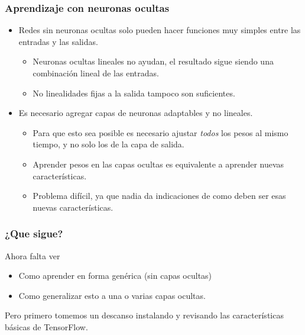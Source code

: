 \documentclass{beamer}
\begin{document}
\begin{frame}
  \frametitle{Aprendizaje con neuronas ocultas}

  \begin{itemize}
  \item Redes sin neuronas ocultas solo pueden hacer funciones muy
    simples entre las entradas y las salidas.
    \begin{itemize}
    \item Neuronas ocultas lineales no ayudan, el resultado sigue
      siendo una combinación lineal de las entradas.
    \item No linealidades fijas a la salida tampoco son suficientes.
    \end{itemize}
  \item Es necesario agregar capas de neuronas adaptables y no
    lineales.
    \begin{itemize}
    \item Para que esto sea posible es necesario ajustar \emph{todos}
      los pesos al mismo tiempo, y no solo los de la capa de salida.
    \item Aprender pesos en las capas ocultas es equivalente a
      aprender nuevas características.
    \item Problema difícil, ya que nadia da indicaciones de como deben
      ser esas nuevas características.
    \end{itemize}
  \end{itemize}
  
\end{frame}

\begin{frame}
  \frametitle{¿Que sigue?}
  
  \begin{block}{}
    Ahora falta ver
    \begin{itemize}
    \item Como aprender en forma genérica (sin capas ocultas)
    \item Como generalizar esto a una o varias capas ocultas.
    \end{itemize}
  \end{block}

\vspace{1cm}

Pero primero tomemos un descanso instalando y revisando las
características básicas de TensorFlow.
\end{frame}
\end{document}
